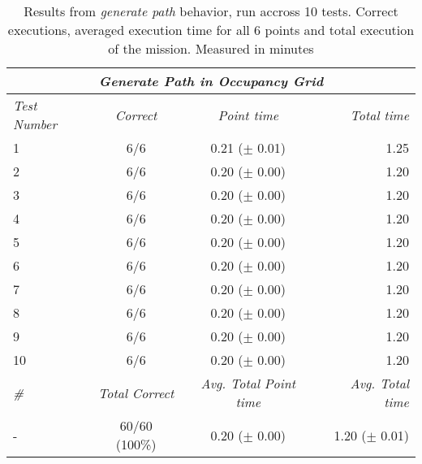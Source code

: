 \begin{table}[!h]
  \centering
  \begin{tabular}{lccr} \toprule
    \multicolumn{4}{c}{\textit{Generate Path in Occupancy Grid}}                        \\ \midrule
    \textit{Test Number} & \textit{Correct} & \textit{Point time} & \textit{Total time} \\ \midrule
      1 & 6/6 & 0.21 ($\pm$ 0.01) & 1.25 \\ \hline
      2 & 6/6 & 0.20 ($\pm$ 0.00) & 1.20 \\ \hline
      3 & 6/6 & 0.20 ($\pm$ 0.00) & 1.20 \\ \hline
      4 & 6/6 & 0.20 ($\pm$ 0.00) & 1.20 \\ \hline
      5 & 6/6 & 0.20 ($\pm$ 0.00) & 1.20 \\ \hline
      6 & 6/6 & 0.20 ($\pm$ 0.00) & 1.20 \\ \hline
      7 & 6/6 & 0.20 ($\pm$ 0.00) & 1.20 \\ \hline
      8 & 6/6 & 0.20 ($\pm$ 0.00) & 1.20 \\ \hline
      9 & 6/6 & 0.20 ($\pm$ 0.00) & 1.20 \\ \hline
      10 & 6/6 & 0.20 ($\pm$ 0.00) & 1.20 \\ \hline
      \textit{\#} & \textit{Total Correct} & \textit{Avg. Total Point time} & \textit{Avg. Total time} \\ \midrule
      - & 60/60 (100\%) & 0.20 ($\pm$ 0.00) & 1.20 ($\pm$ 0.01) \\ \bottomrule
      \hline
  \end{tabular}
  \caption{Results from \textit{generate path} behavior, run accross 10 tests. Correct executions, averaged execution time for all 6 points and total execution of the mission. Measured in minutes}
  \label{ch_5:table:generate_path_results}
\end{table}
